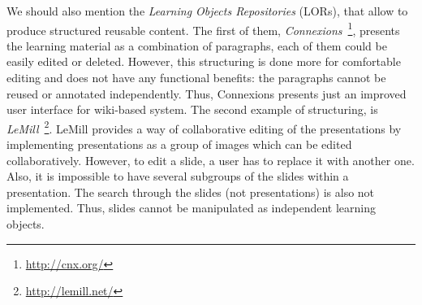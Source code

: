 \documentclass[ngerman,UKenglish,table]{scrbook}
\makeatletter
\newcommand{\todo}[1]{\textcolor{red}{@TODO: #1}}
\makeatother
\begin{document}


We should also mention the \emph{Learning Objects Repositories} (LORs), that allow to produce structured reusable content.
The first of them, \emph{Connexions}~\footnote{\url{http://cnx.org/}}, presents the learning material as a combination of paragraphs, each of them could be easily edited or deleted.
However, this structuring is done more for comfortable editing and does not have any functional benefits: the paragraphs cannot be reused or annotated independently.
Thus, Connexions presents just an improved user interface for  wiki-based system.
The second example of structuring, is \emph{LeMill}~\footnote{\url{http://lemill.net/}}.
LeMill provides a way of collaborative editing of the presentations by implementing presentations as a group of images which can be edited collaboratively.
However, to edit a slide, a user has to replace it with another one.
Also, it is impossible to have several subgroups of the slides within a presentation.
The search through the slides (not presentations) is also not implemented.
Thus, slides cannot be manipulated as independent learning objects.
\end{document}
